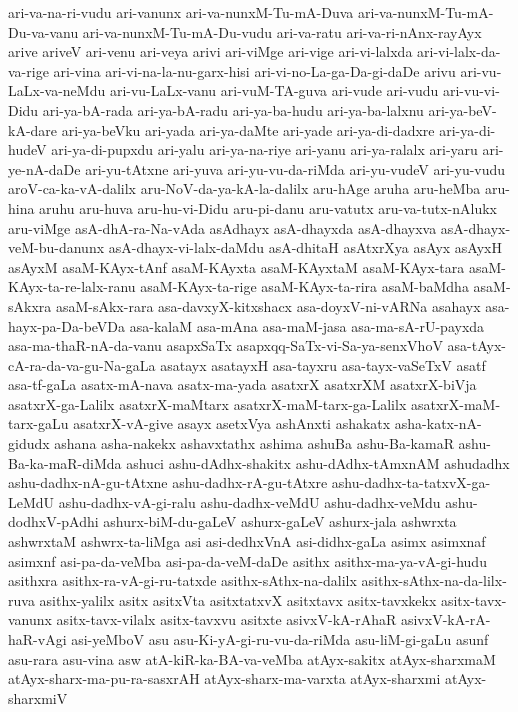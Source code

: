 {ari-va-na-ri-vudu
ari-vanunx
ari-va-nunxM-Tu-mA-Duva
ari-va-nunxM-Tu-mA-Du-va-vanu
ari-va-nunxM-Tu-mA-Du-vudu
ari-va-ratu
ari-va-ri-nAnx-rayAyx
arive
ariveV
ari-venu
ari-veya
arivi
ari-viMge
ari-vige
ari-vi-lalxda
ari-vi-lalx-da-va-rige
ari-vina
ari-vi-na-la-nu-garx-hisi
ari-vi-no-La-ga-Da-gi-daDe
arivu
ari-vu-LaLx-va-neMdu
ari-vu-LaLx-vanu
ari-vuM-TA-guva
ari-vude
ari-vudu
ari-vu-vi-Didu
ari-ya-bA-rada
ari-ya-bA-radu
ari-ya-ba-hudu
ari-ya-ba-lalxnu
ari-ya-beV-kA-dare
ari-ya-beVku
ari-yada
ari-ya-daMte
ari-yade
ari-ya-di-dadxre
ari-ya-di-hudeV
ari-ya-di-pupxdu
ari-yalu
ari-ya-na-riye
ari-yanu
ari-ya-ralalx
ari-yaru
ari-ye-nA-daDe
ari-yu-tAtxne
ari-yuva
ari-yu-vu-da-riMda
ari-yu-vudeV
ari-yu-vudu
aroV-ca-ka-vA-dalilx
aru-NoV-da-ya-kA-la-dalilx
aru-hAge
aruha
aru-heMba
aru-hina
aruhu
aru-huva
aru-hu-vi-Didu
aru-pi-danu
aru-vatutx
aru-va-tutx-nAlukx
aru-viMge
asA-dhA-ra-Na-vAda
asAdhayx
asA-dhayxda
asA-dhayxva
asA-dhayx-veM-bu-danunx
asA-dhayx-vi-lalx-daMdu
asA-dhitaH
asAtxrXya
asAyx
asAyxH
asAyxM
asaM-KAyx-tAnf
asaM-KAyxta
asaM-KAyxtaM
asaM-KAyx-tara
asaM-KAyx-ta-re-lalx-ranu
asaM-KAyx-ta-rige
asaM-KAyx-ta-rira
asaM-baMdha
asaM-sAkxra
asaM-sAkx-rara
asa-davxyX-kitxshacx
asa-doyxV-ni-vARNa
asahayx
asa-hayx-pa-Da-beVDa
asa-kalaM
asa-mAna
asa-maM-jasa
asa-ma-sA-rU-payxda
asa-ma-thaR-nA-da-vanu
asapxSaTx
asapxqq-SaTx-vi-Sa-ya-senxVhoV
asa-tAyx-cA-ra-da-va-gu-Na-gaLa
asatayx
asatayxH
asa-tayxru
asa-tayx-vaSeTxV
asatf
asa-tf-gaLa
asatx-mA-nava
asatx-ma-yada
asatxrX
asatxrXM
asatxrX-biVja
asatxrX-ga-Lalilx
asatxrX-maMtarx
asatxrX-maM-tarx-ga-Lalilx
asatxrX-maM-tarx-gaLu
asatxrX-vA-give
asayx
asetxVya
ashAnxti
ashakatx
asha-katx-nA-gidudx
ashana
asha-nakekx
ashavxtathx
ashima
ashuBa
ashu-Ba-kamaR
ashu-Ba-ka-maR-diMda
ashuci
ashu-dAdhx-shakitx
ashu-dAdhx-tAmxnAM
ashudadhx
ashu-dadhx-nA-gu-tAtxne
ashu-dadhx-rA-gu-tAtxre
ashu-dadhx-ta-tatxvX-ga-LeMdU
ashu-dadhx-vA-gi-ralu
ashu-dadhx-veMdU
ashu-dadhx-veMdu
ashu-dodhxV-pAdhi
ashurx-biM-du-gaLeV
ashurx-gaLeV
ashurx-jala
ashwrxta
ashwrxtaM
ashwrx-ta-liMga
asi
asi-dedhxVnA
asi-didhx-gaLa
asimx
asimxnaf
asimxnf
asi-pa-da-veMba
asi-pa-da-veM-daDe
asithx
asithx-ma-ya-vA-gi-hudu
asithxra
asithx-ra-vA-gi-ru-tatxde
asithx-sAthx-na-dalilx
asithx-sAthx-na-da-lilx-ruva
asithx-yalilx
asitx
asitxVta
asitxtatxvX
asitxtavx
asitx-tavxkekx
asitx-tavx-vanunx
asitx-tavx-vilalx
asitx-tavxvu
asitxte
asivxV-kA-rAhaR
asivxV-kA-rA-haR-vAgi
asi-yeMboV
asu
asu-Ki-yA-gi-ru-vu-da-riMda
asu-liM-gi-gaLu
asunf
asu-rara
asu-vina
asw
atA-kiR-ka-BA-va-veMba
atAyx-sakitx
atAyx-sharxmaM
atAyx-sharx-ma-pu-ra-sasxrAH
atAyx-sharx-ma-varxta
atAyx-sharxmi
atAyx-sharxmiV
}

